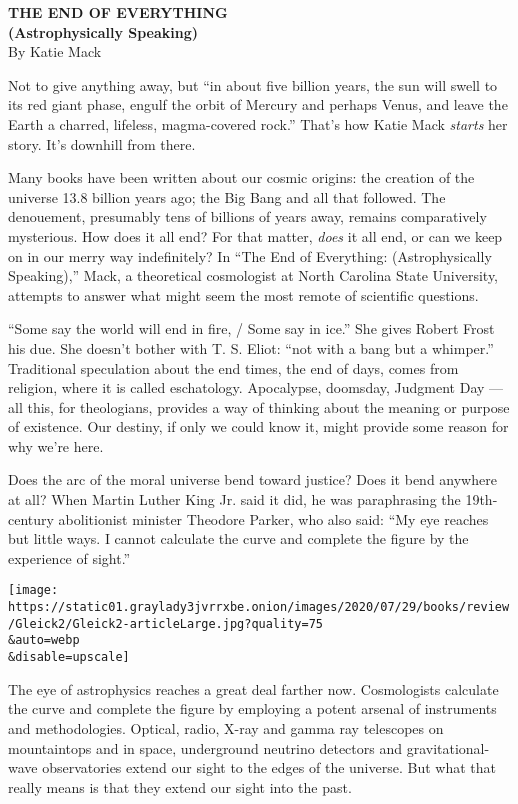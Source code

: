 \textbf{THE END OF EVERYTHING}\\
\textbf{(Astrophysically Speaking)}\\
By Katie Mack

Not to give anything away, but ``in about five billion years, the sun
will swell to its red giant phase, engulf the orbit of Mercury and
perhaps Venus, and leave the Earth a charred, lifeless, magma-covered
rock.'' That's how Katie Mack \emph{starts} her story. It's downhill
from there.

Many books have been written about our cosmic origins: the creation of
the universe 13.8 billion years ago; the Big Bang and all that followed.
The denouement, presumably tens of billions of years away, remains
comparatively mysterious. How does it all end? For that matter,
\emph{does} it all end, or can we keep on in our merry way indefinitely?
In ``The End of Everything: (Astrophysically Speaking),'' Mack, a
theoretical cosmologist at North Carolina State University, attempts to
answer what might seem the most remote of scientific questions.

``Some say the world will end in fire, / Some say in ice.'' She gives
Robert Frost his due. She doesn't bother with T. S. Eliot: ``not with a
bang but a whimper.'' Traditional speculation about the end times, the
end of days, comes from religion, where it is called eschatology.
Apocalypse, doomsday, Judgment Day --- all this, for theologians,
provides a way of thinking about the meaning or purpose of existence.
Our destiny, if only we could know it, might provide some reason for why
we're here.

Does the arc of the moral universe bend toward justice? Does it bend
anywhere at all? When Martin Luther King Jr. said it did, he was
paraphrasing the 19th-century abolitionist minister Theodore Parker, who
also said: ``My eye reaches but little ways. I cannot calculate the
curve and complete the figure by the experience of sight.''

\texttt{[image: https://static01.graylady3jvrrxbe.onion/images/2020/07/29/books/review/Gleick2/Gleick2-articleLarge.jpg?quality=75\\\&auto=webp\\\&disable=upscale]}

The eye of astrophysics reaches a great deal farther now. Cosmologists
calculate the curve and complete the figure by employing a potent
arsenal of instruments and methodologies. Optical, radio, X-ray and
gamma ray telescopes on mountaintops and in space, underground neutrino
detectors and gravitational-wave observatories extend our sight to the
edges of the universe. But what that really means is that they extend
our sight into the past.

